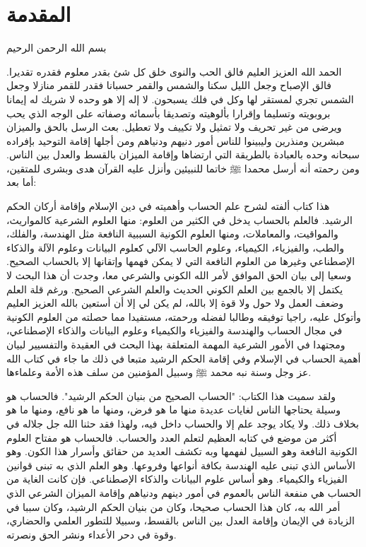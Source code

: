 \chapter*{المقدمة}

\begin{center}
    بسم الله الرحمن الرحيم
\end{center}

الحمد الله العزيز العليم فالق الحب والنوى خلق كل شئ بقدر معلوم فقدره تقديرا. فالق الإصباح وجعل الليل سكنا والشمس والقمر حسبانا فقدر للقمر منازلا وجعل الشمس تجري لمستقر لها وكل في فلك يسبحون. لا إله إلا هو وحده لا شريك له  إيمانا بروبويته وتسليما وإقرارا بألوهيته وتصديقا بأسمائه وصفاته على الوجه الذي يحب ويرضى من غير تحريف ولا تمثيل ولا تكييف ولا تعطيل. بعث الرسل بالحق والميزان مبشرين ومنذرين وليبينوا للناس أمور دنيهم ودنياهم ومن أجلها إقامة التوحيد بإفراده سبحانه وحده بالعبادة بالطريقة التي ارتضاها وإقامة الميزان بالقسط والعدل بين الناس. ومن رحمته أنه أرسل محمدا ﷺ خاتما للنبيئين وأنزل عليه القرآن هدى وبشرى للمتقين، أما بعد:

هذا كتاب ألفته لشرح علم الحساب وأهميته في دين الإسلام وإقامة أركان الحكم الرشيد. فالعلم بالحساب يدخل في الكثير من العلوم: منها العلوم الشرعية كالمواريث، والمواقيت، والمعاملات، ومنها العلوم الكونية السببية النافعة مثل الهندسة، والفلك، والطب، والفيزياء، الكيمياء، وعلوم الحاسب الآلي كعلوم البيانات وعلوم الآلة والذكاء الإصطناعي وغيرها من العلوم النافعة التي لا يمكن فهمها وإتقانها إلا بالحساب الصحيح. وسعيا إلى بيان الحق الموافق لأمر الله الكوني والشرعي معا، وجدت أن هذا البحث لا يكتمل إلا بالجمع بين العلم الكوني الحديث والعلم الشرعي الصحيح. ورغم قلة العلم وضعف العمل ولا حول ولا قوة إلا بالله، لم يكن لي إلا أن أستعين بالله العزيز العليم وأتوكل عليه، راجيا توفيقه وطالبا لفضله ورحمته، مستفيدا مما حصلته من العلوم الكونية في مجال الحساب والهندسة والفيزياء والكيمياء وعلوم البيانات والذكاء الإصطناعي، ومجتهدا في الأمور الشرعية المهمة المتعلقة بهذا البحث في العقيدة والتفسيير لبيان أهمية الحساب في الإسلام وفي إقامة الحكم الرشيد متبعا في ذلك ما جاء في كتاب الله عز وجل وسنة نبه محمد ﷺ وسبيل المؤمنين من سلف هذه الأمة وعلماءها.

ولقد سميت هذا الكتاب: "الحساب الصحيح من بنيان الحكم الرشيد". فالحساب هو وسيلة يحتاجها الناس لغايات عديدة منها ما هو فرض، ومنها ما هو نافع، ومنها ما هو بخلاف ذلك. ولا يكاد يوجد علم إلا والحساب داخل فيه، ولهذا فقد حثنا الله جل جلاله في أكثر من موضع في كتابه العظيم لتعلم العدد والحساب. فالحساب هو مفتاح العلوم الكونية النافعة وهو السبيل لفهمها وبه تكشف العديد من حقائق وأسرار هذا الكون. وهو الأساس الذي تبنى عليه الهندسة بكافة أنواعها وفروعها. وهو العلم الذي به تبنى قوانين الفيزياء والكيمياء. وهو أساس علوم البيانات والذكاء الإصطناعي. فإن كانت الغاية من الحساب هي منفعة الناس بالعموم في أمور دينهم ودنياهم وإقامة الميزان الشرعي الذي أمر الله به، كان هذا الحساب صحيحا، وكان من بنيان الحكم الرشيد، وكان سببا في الزيادة في الإيمان وإقامة العدل بين الناس بالقسط، وسبيلا للتطور العلمي والحضاري، وقوة في دحر الأعداء ونشر الحق ونصرته. 

